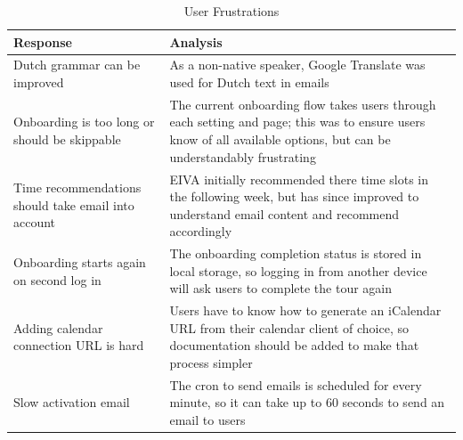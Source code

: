 \documentclass{article}
\begin{document}
\begin{table}[!htb]
	\caption{User Frustrations}
	\centering
	\begin{tabular}{p{4cm}p{7cm}}
		\hline
		\textbf{Response}                                   & \textbf{Analysis}                                                                                                                                                    \\
		\hline
		Dutch grammar can be improved                       & As a non-native speaker, Google Translate was used for Dutch text in emails                                                                                          \\
		\hline
		Onboarding is too long or should be skippable       & The current onboarding flow takes users through each setting and page; this was to ensure users know of all available options, but can be understandably frustrating \\
		\hline
		Time recommendations should take email into account & EIVA initially recommended there time slots in the following week, but has since improved to understand email content and recommend accordingly                      \\
		\hline
		Onboarding starts again on second log in            & The onboarding completion status is stored in local storage, so logging in from another device will ask users to complete the tour again                             \\
		\hline
		Adding calendar connection URL is hard              & Users have to know how to generate an iCalendar URL from their calendar client of choice, so documentation should be added to make that process simpler              \\
		\hline
		Slow activation email                               & The cron to send emails is scheduled for every minute, so it can take up to 60 seconds to send an email to users                                                     \\
		\hline
	\end{tabular}
\end{table}
\end{document}
